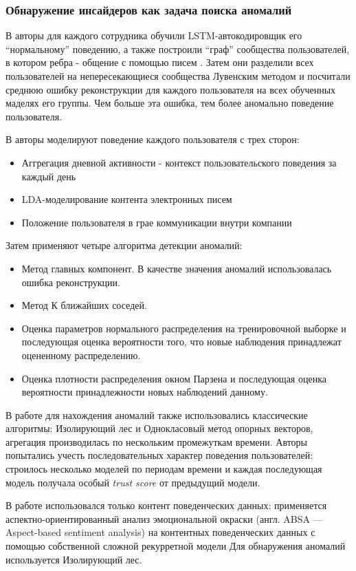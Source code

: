 \subsubsection{Обнаружение инсайдеров как задача поиска аномалий}

В \cite{lac} авторы для каждого сотрудника обучили LSTM-автокодировщик его ``нормальному'' поведению, а также построили ``граф''  сообщества пользователей, в котором ребра - общение с помощью писем . Затем они разделили всех пользователей на непересекающиеся сообщества Лувенским методом\cite{louvain} и посчитали среднюю ошибку реконструкции для каждого пользователя на всех обученных маделях его группы. Чем больше эта ошибка, тем более аномально поведение пользователя.

В \cite{anomalyalgo} авторы моделируют поведение каждого пользователя с трех сторон:
\begin{itemize}
\item Аггрегация дневной активности - контекст пользовательского поведения за каждый день
\item LDA-моделирование контента электронных писем
\item Положение пользователя в грае коммуникации внутри компании
\end{itemize}
Затем применяют четыре алгоритма детекции аномалий:
\begin{itemize}
\item Метод главных компонент. В качестве значения аномалий использовалась ошибка реконструкции.
\item Метод К ближайших соседей.
\item Оценка параметров нормального распределения на тренировочной выборке и последующая оценка вероятности того, что новые наблюдения принадлежат оцененному распределению.
\item Оценка плотности распределения окном Парзена и последующая оценка вероятности принадлежности новых наблюдений данному.
\end{itemize}

В работе \cite{ocsvm} для нахождения аномалий также использовались классические алгоритмы: Изолирующий лес и Однокласовый метод опорных векторов, агрегация производилась по нескольким промежуткам времени. Авторы попытались учесть последовательных характер поведения пользователей: строилось несколько моделей по периодам времени и каждая последующая модель получала особый \textit{trust score} от предыдущий модели.

В работе \cite{absa} использовался только контент поведенческих данных: применяется аспектно-ориентированный анализ эмоциональной окраски (англ. ABSA --- Aspect-based sentiment analysis) на контентных поведенческих данных с помощью собственной сложной рекурретной модели Для обнаружения аномалий используется Изолирующий лес.

